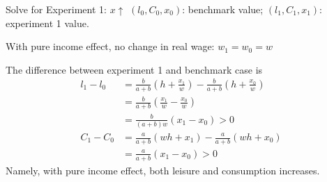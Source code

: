 \documentclass[11pt,aspectratio=43]{beamer}
\theoremstyle{definition}
\begin{document}
\begin{frame}{Solve for Experiment 1: $ x \uparrow  $}
\label{slide:Solve_for_Experiment_1____x__uparrow_______}
$ (l_{0}, C_{0}, x_{0} )$: benchmark value;
$ (l_{1}, C_{1}, x_{1} )$: experiment 1 value.

With pure income effect, \alert{no change in real wage}: $ w_{1} = w_{0} = w$

The difference between experiment 1 and benchmark case is
%
\begin{align}
    l_{1} - l_{0}
        & = \frac{b}{a+b} \left( h + \frac{x_{1}}{w} \right)
          - \frac{b}{a+b} \left( h + \frac{x_{0}}{w} \right)
    \\
        & = \frac{b}{a+b} \left( \frac{x_{1}}{w} - \frac{x_{0}}{w} \right)
    \\
        & = \frac{b}{(a+b)w} \left( x_{1} - x_{0} \right) > 0
    \\
    C_{1} - C_{0}
        & = \frac{a}{a+b} \left( wh + x_{1} \right)
          - \frac{a}{a+b} \left( wh + x_{0} \right)
    \\
        & = \frac{a}{a+b} \left( x_{1} - x_{0} \right) > 0
\end{align}
%
Namely, with pure income effect, \alert{both leisure and consumption increases}.
\end{frame}
\end{document}
